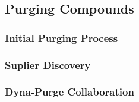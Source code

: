 
\subsection{Purging Compounds\label{sec:methedology:extrusion:purgingCompounds}}

\subsubsection{Initial Purging Process\label{sec:methedology:extrusion:purgingCompounds:initialProcess}}

\subsubsection{Suplier Discovery\label{sec:methedology:extrusion:purgingCompounds:supplierDiscovery}}

\subsubsection{Dyna-Purge Collaboration\label{sec:methedology:extrusion:purgingCompounds:dynaPurgeCollaboration}}
